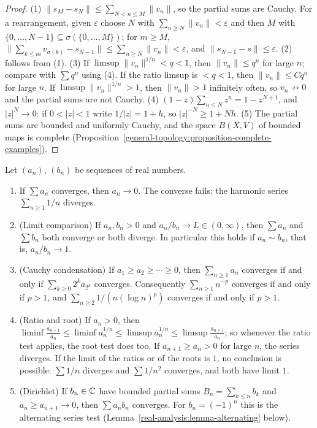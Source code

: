 \begin{proof}
(1) $\|s_M - s_N\| \leq \sum_{N < n \leq M}\|v_n\|$, so the partial sums are Cauchy. For a rearrangement, given $\varepsilon$ choose $N$ with $\sum_{n \geq N}\|v_n\| < \varepsilon$ and then $M$
with $\{0, \ldots, N-1\} \subseteq \sigma(\{0, \ldots, M\})$; for $m \geq M$, $\|\sum_{k \leq m}v_{\sigma(k)} - s_{N-1}\| \leq \sum_{n \geq N}\|v_n\| < \varepsilon$, and $\|s_{N-1} - s\| \leq \varepsilon$.
(2) follows from (1). (3) If $\limsup\|v_n\|^{1/n} < q < 1$, then $\|v_n\| \leq q^n$ for large $n$; compare with $\sum q^n$ using (4). If the ratio limsup is $< q < 1$, then
$\|v_n\| \leq Cq^n$ for large $n$. If $\limsup\|v_n\|^{1/n} > 1$, then $\|v_n\| > 1$ infinitely often, so $v_n \not\to 0$ and the partial sums are not Cauchy. (4)
$(1 - z)\sum_{n \leq N}z^n = 1 - z^{N+1}$, and $|z|^N \to 0$: if $0 < |z| < 1$ write $1/|z| = 1 + h$, so $|z|^{-N} \geq 1 + Nh$. (5) The partial sums are bounded and uniformly Cauchy, and the space
$B(X, V)$ of bounded maps is complete (Proposition~\ref{general-topology:proposition-complete-examples}).
\end{proof}

\begin{proposition}\label{real-analysis:proposition-series-tests}
Let $(a_n)$, $(b_n)$ be sequences of real numbers.
\begin{enumerate}
\item If $\sum a_n$ converges, then $a_n \to 0$. The converse fails: the harmonic series $\sum_{n \geq 1}1/n$ diverges.
\item (Limit comparison) If $a_n, b_n > 0$ and $a_n/b_n \to L \in (0, \infty)$, then $\sum a_n$ and $\sum b_n$ both converge or both diverge. In particular this holds if $a_n \sim b_n$, that is,
$a_n/b_n \to 1$.
\item (Cauchy condensation) If $a_1 \geq a_2 \geq \cdots \geq 0$, then $\sum_{n \geq 1}a_n$ converges if and only if $\sum_{k \geq 0}2^ka_{2^k}$ converges. Consequently $\sum_{n \geq 1}n^{-p}$
converges if and only if $p > 1$, and $\sum_{n \geq 2}1/(n(\log n)^p)$ converges if and only if $p > 1$.
\item (Ratio and root) If $a_n > 0$, then $\liminf\frac{a_{n+1}}{a_n} \leq \liminf a_n^{1/n} \leq \limsup a_n^{1/n} \leq \limsup\frac{a_{n+1}}{a_n}$; so whenever the ratio test applies, the root test
does too. If $a_{n+1} \geq a_n > 0$ for large $n$, the series diverges. If the limit of the ratios or of the roots is $1$, no conclusion is possible: $\sum 1/n$ diverges and $\sum 1/n^2$
converges, and both have limit $1$.
\item (Dirichlet) If $b_n \in \mathbb{C}$ have bounded partial sums $B_n = \sum_{k \leq n}b_k$ and $a_n \geq a_{n+1} \to 0$, then $\sum a_nb_n$ converges. For $b_n = (-1)^n$ this is the alternating
series test (Lemma~\ref{real-analysis:lemma-alternating} below).
\end{enumerate}
\end{proposition}


